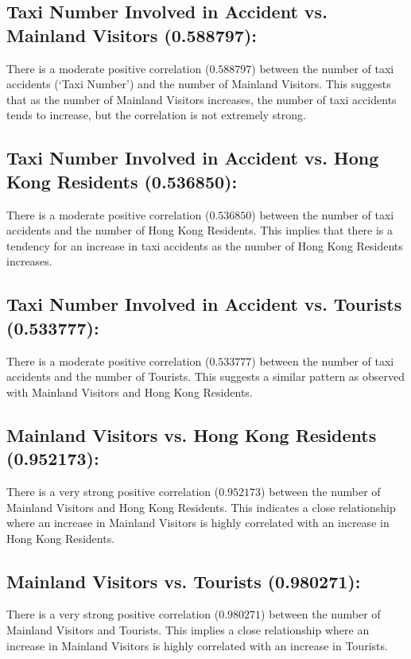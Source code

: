 \documentclass{article}
\begin{document}
\subsection*{Taxi Number Involved in Accident vs. Mainland Visitors (0.588797):}

There is a moderate positive correlation ($0.588797$) between the number of taxi accidents (`Taxi Number') and the number of Mainland Visitors. This suggests that as the number of Mainland Visitors increases, the number of taxi accidents tends to increase, but the correlation is not extremely strong.

\subsection*{Taxi Number Involved in Accident vs. Hong Kong Residents (0.536850):}

There is a moderate positive correlation ($0.536850$) between the number of taxi accidents and the number of Hong Kong Residents. This implies that there is a tendency for an increase in taxi accidents as the number of Hong Kong Residents increases.

\subsection*{Taxi Number Involved in Accident vs. Tourists (0.533777):}

There is a moderate positive correlation ($0.533777$) between the number of taxi accidents and the number of Tourists. This suggests a similar pattern as observed with Mainland Visitors and Hong Kong Residents.

\subsection*{Mainland Visitors vs. Hong Kong Residents (0.952173):}

There is a very strong positive correlation ($0.952173$) between the number of Mainland Visitors and Hong Kong Residents. This indicates a close relationship where an increase in Mainland Visitors is highly correlated with an increase in Hong Kong Residents.

\subsection*{Mainland Visitors vs. Tourists (0.980271):}

There is a very strong positive correlation ($0.980271$) between the number of Mainland Visitors and Tourists. This implies a close relationship where an increase in Mainland Visitors is highly correlated with an increase in Tourists.
\end{document}
